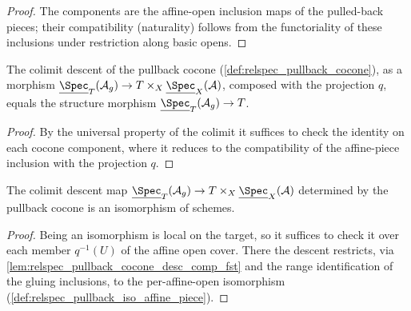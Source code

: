 \begin{proof}
  The components are the affine-open inclusion maps of the pulled-back pieces; their
  compatibility (naturality) follows from the functoriality of these inclusions under
  restriction along basic opens.
\end{proof}

\begin{lemma}
  \label{lem:relspec_pullback_cocone_desc_comp_fst}
  The colimit descent of the pullback cocone
  (\cref{def:relspec_pullback_cocone}), as a morphism
  \(\underline{\Spec}_T(\mathcal{A}_g) \to
    T \times_X \underline{\Spec}_X(\mathcal{A})\),
  composed with the projection \(q\), equals the structure morphism
  \(\underline{\Spec}_T(\mathcal{A}_g) \to T\).
\end{lemma}

\begin{proof}
  By the universal property of the colimit it suffices to check the identity on each
  cocone component, where it reduces to the compatibility of the affine-piece
  inclusion with the projection \(q\).
\end{proof}

\begin{lemma}
  \label{lem:relspec_pullback_iso_desc_isiso}
  The colimit descent map
  \(\underline{\Spec}_T(\mathcal{A}_g) \to
    T \times_X \underline{\Spec}_X(\mathcal{A})\)
  determined by the pullback cocone is an isomorphism of schemes.
\end{lemma}

\begin{proof}
  Being an isomorphism is local on the target, so it suffices to check it over each
  member \(q^{-1}(U)\) of the affine open cover. There the descent restricts, via
  \cref{lem:relspec_pullback_cocone_desc_comp_fst} and the range identification of the
  gluing inclusions, to the per-affine-open isomorphism
  (\cref{def:relspec_pullback_iso_affine_piece}).
\end{proof}

